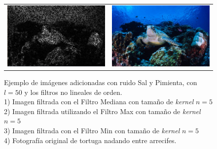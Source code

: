 \begin{landscape}
\begin{figure}[!h]
\begin{tabular}{cc}
				\includegraphics[width=12.25cm]{Imagenes/Ruido_sp_50_min_5.png} & \includegraphics[width=12.25cm]{Imagenes/tortuga.jpeg}
			\end{tabular}
			\label{Ruido_SalPimienta_Filtros_no_lineales}
			\caption{Ejemplo de imágenes adicionadas con ruido Sal y Pimienta, con $l = 50$ y los filtros no lineales de orden. \\ 1) Imagen filtrada con el Filtro Mediana con tamaño de \textit{kernel} $n = 5$ \\ 2) Imagen filtrada utilizando el Filtro Max con tamaño de \textit{kernel} $n = 5$ \\ 3) Imagen filtrada con el Filtro Min con tamaño de \textit{kernel} $n = 5$ \\ 4) Fotografía original de tortuga nadando entre arrecifes. }
		\end{figure}
	\end{landscape}

